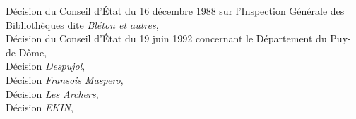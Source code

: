 \documentclass[math]{cours}
\begin{document}
\begin{thebibliography}{255}
		\url{}
		Décision du Conseil d'État du 16 décembre 1988 sur l'Inspection Générale des Bibliothèques dite \emph{Bléton et autres},\\
		\url{}
		Décision du Conseil d'État du 19 juin 1992 concernant le Département du Puy-de-Dôme,\\
		\url{}
		Décision \emph{Despujol},\\
		\url{}
		Décision \emph{Fransois Maspero},\\
		\url{}
		Décision \emph{Les Archers},\\
		\url{}
		Décision \emph{EKIN},\\
		\url{}
\end{thebibliography}
\newpage
{}

\end{document}
